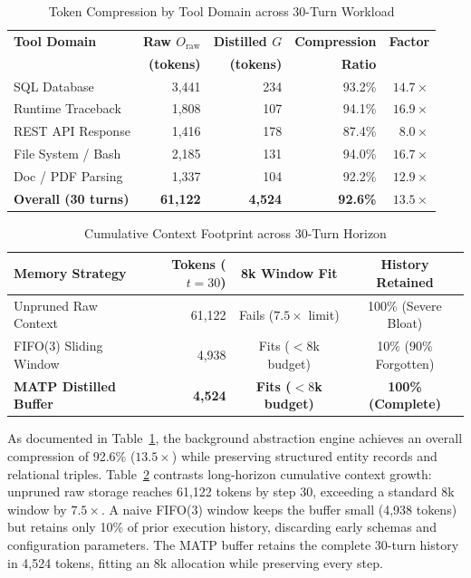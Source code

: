 \documentclass[lettersize,journal]{IEEEtran}
\begin{document}
\begin{table}[!t]
\caption{Token Compression by Tool Domain across 30-Turn Workload\label{tab:compression}}
\centering
{\small
\begin{tabular}{lrrrr}
\toprule
\textbf{Tool Domain} & \textbf{Raw $O_{\text{raw}}$} & \textbf{Distilled $G$} & \textbf{Compression} & \textbf{Factor} \\
 & \textbf{(tokens)} & \textbf{(tokens)} & \textbf{Ratio} & \\
\midrule
SQL Database       & 3,441 & 234 & 93.2\% & $14.7\times$ \\
Runtime Traceback  & 1,808 & 107 & 94.1\% & $16.9\times$ \\
REST API Response  & 1,416 & 178 & 87.4\% &  $8.0\times$ \\
File System / Bash & 2,185 & 131 & 94.0\% & $16.7\times$ \\
Doc / PDF Parsing  & 1,337 & 104 & 92.2\% & $12.9\times$ \\
\midrule
\textbf{Overall (30 turns)} & \textbf{61,122} & \textbf{4,524} & \textbf{92.6\%} & $\mathbf{13.5\times}$ \\
\bottomrule
\end{tabular}
}
\end{table}

\begin{table}[!t]
\caption{Cumulative Context Footprint across 30-Turn Horizon\label{tab:context_growth}}
\centering
{\small
\begin{tabular}{lrcc}
\toprule
\textbf{Memory Strategy} & \textbf{Tokens ($t=30$)} & \textbf{8k Window Fit} & \textbf{History Retained} \\
\midrule
Unpruned Raw Context     & 61,122 & Fails ($7.5\times$ limit) & 100\% (Severe Bloat) \\
FIFO(3) Sliding Window   &  4,938 & Fits ($< 8$k budget)       & 10\% (90\% Forgotten) \\
\textbf{MATP Distilled Buffer} & \textbf{4,524} & \textbf{Fits ($< 8$k budget)} & \textbf{100\% (Complete)} \\
\bottomrule
\end{tabular}
}
\end{table}

As documented in Table~\ref{tab:compression}, the background abstraction engine achieves an overall compression of 92.6\% ($13.5\times$) while preserving structured entity records and relational triples. Table~\ref{tab:context_growth} contrasts long-horizon cumulative context growth: unpruned raw storage reaches 61,122 tokens by step 30, exceeding a standard 8k window by $7.5\times$. A naive FIFO(3) window keeps the buffer small (4,938 tokens) but retains only 10\% of prior execution history, discarding early schemas and configuration parameters. The MATP buffer retains the complete 30-turn history in 4,524 tokens, fitting an 8k allocation while preserving every step.
\end{document}
